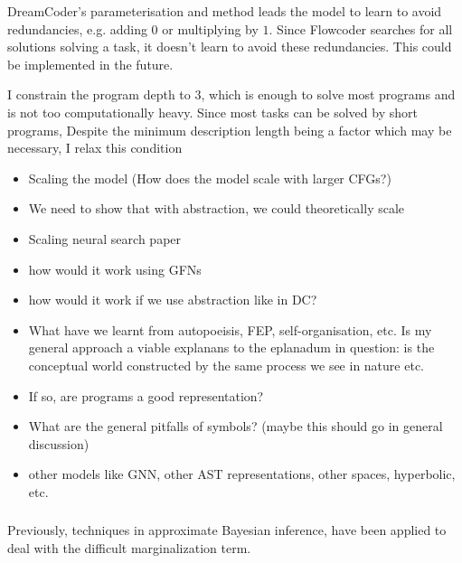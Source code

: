 
DreamCoder's parameterisation and method leads the model to learn to avoid redundancies, e.g. adding $0$ or multiplying by $1$. Since Flowcoder searches for all solutions solving a task, it doesn't learn to avoid these redundancies. This could be implemented in the future.

I constrain the program depth to 3, which is enough to solve most programs and is not too computationally heavy.
Since most tasks can be solved by short programs, 
Despite the minimum description length being a factor which may be necessary, I relax this condition











\begin{itemize}
    \item Scaling the model (How does the model scale with larger CFGs?)
    \item We need to show that with abstraction, we could theoretically scale
    \item Scaling neural search paper
    \item how would it work using GFNs
    \item how would it work if we use abstraction like in DC? 
    \item What have we learnt from autopoeisis, FEP, self-organisation, etc. Is my general approach a viable explanans to the eplanadum in question: is the conceptual world constructed by the same process we see in nature etc.
    \item If so, are programs a good representation?
    \item What are the general pitfalls of symbols?  (maybe this should go in general discussion)
    \item other models like GNN, other AST representations, other spaces, hyperbolic, etc. 
\end{itemize}



\subsubsection{}

Previously, techniques in approximate Bayesian inference, have been applied to deal with the difficult marginalization term.

